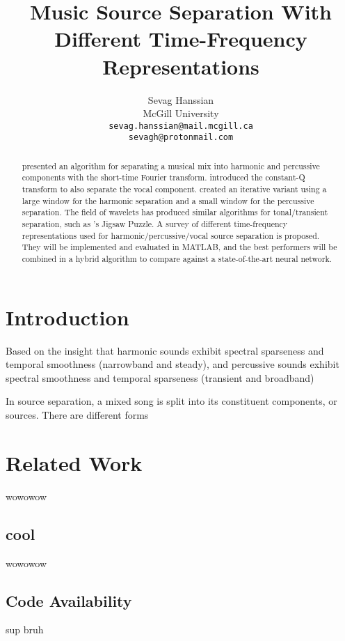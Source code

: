 \documentclass[12pt,letter]{article}
\title{Music Source Separation With Different Time-Frequency Representations}
\author{Sevag Hanssian \\
  McGill University \\
 \texttt{sevag.hanssian@mail.mcgill.ca} \\
 \texttt{sevagh@protonmail.com}}
\date{}
\begin{document}
\maketitle
\begin{abstract}
	\citet{fitzgerald1} presented an algorithm for separating a musical mix into harmonic and percussive components with the short-time Fourier transform. \citet{fitzgerald2} introduced the constant-Q transform to also separate the vocal component. \citet{driedger} created an iterative variant using a large window for the harmonic separation and a small window for the percussive separation. The field of wavelets has produced similar algorithms for tonal/transient separation, such as \citet{tfjigsaw}'s Jigsaw Puzzle. A survey of different time-frequency representations used for harmonic/percussive/vocal source separation is proposed. They will be implemented and evaluated in MATLAB, and the best performers will be combined in a hybrid algorithm to compare against a state-of-the-art neural network.
\end{abstract}

\section{Introduction}
\label{sec:intro}

Based on the insight that harmonic sounds exhibit spectral sparseness and temporal smoothness (narrowband and steady), and percussive sounds exhibit spectral smoothness and temporal sparseness (transient and broadband)

In source separation, a mixed song is split into its constituent components, or sources. There are different forms


\section{Related Work}
\label{sec:related}

wowowow

\subsection{cool}

wowowow

\subsection{Code Availability}

sup bruh

\vfill
\clearpage %

\nocite{*}
\printbibheading[title={References}]
\printbibliography[heading=none]
\end{document}
